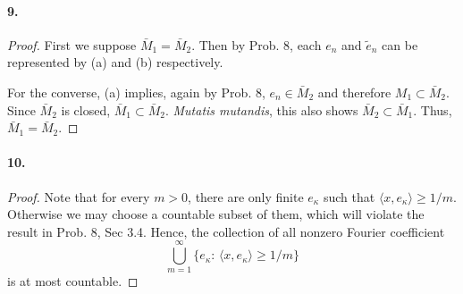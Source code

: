   \paragraph{9.}
  \begin{proof}
    First we suppose $\bar{M}_1=\bar{M}_2$. Then by Prob. 8, each $e_n$ and
    $\tilde{e}_n$ can be represented by (a) and (b) respectively.\par
    For the converse, (a) implies, again by Prob. 8, $e_n\in\bar{M}_2$ and
    therefore $M_1\subset\bar{M}_2$. Since $\bar{M}_2$ is closed, $\bar{M}_1
    \subset\bar{M}_2$. \textit{Mutatis mutandis}, this also shows $\bar{M}_2
    \subset\bar{M}_1$. Thus, $\bar{M}_1=\bar{M}_2$.
  \end{proof}
  
  \paragraph{10.}
  \begin{proof}
    Note that for every $m>0$, there are only finite $e_\kappa$ such that $
    \langle x,e_\kappa\rangle\ge 1/m$. Otherwise we may choose a countable
    subset of them, which will violate the result in Prob. 8, Sec 3.4. Hence,
    the collection of all nonzero Fourier coefficient
    \[
      \bigcup_{m=1}^\infty\{ e_\kappa:\, \langle x,e_\kappa\rangle\ge 1/m \}
    \]
    is at most countable.
  \end{proof}
  

















